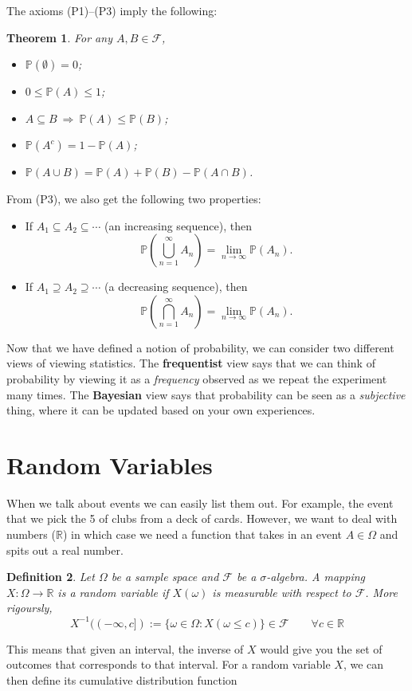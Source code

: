 \documentclass[twoside]{article}
\newcounter{lecnum}
\newenvironment{motivation}
  {\begin{tcolorbox}[motivationstyle]}
  {\end{tcolorbox}}
\newtheorem{theorem}{Theorem}[lecnum]
\newtheorem{definition}[theorem]{Definition}
\newcommand\F{\mathcal{F}}
\begin{document}
The axioms (P1)–(P3) imply the following:

\begin{theorem}
For any $A,B\in\mathcal{F}$,
\begin{itemize}
  \item $\mathbb{P}(\emptyset)=0$;
  \item $0\le \mathbb{P}(A)\le 1$;
  \item $A\subseteq B \ \Rightarrow\ \mathbb{P}(A)\le \mathbb{P}(B)$;
  \item $\mathbb{P}(A^{c}) = 1-\mathbb{P}(A)$;
  \item $\mathbb{P}(A\cup B)=\mathbb{P}(A)+\mathbb{P}(B)-\mathbb{P}(A\cap B)$.
\end{itemize}
\end{theorem}

From (P3), we also get the following two properties:

\begin{itemize}
    \item If $A_1\subseteq A_2\subseteq\cdots$ (an increasing sequence), then
\[
  \mathbb{P}\!\left(\bigcup_{n=1}^{\infty} A_n\right)
  = \lim_{n\to\infty}\mathbb{P}(A_n).
\]
\item If $A_1\supseteq A_2\supseteq\cdots$ (a decreasing sequence), then
\[
  \mathbb{P}\!\left(\bigcap_{n=1}^{\infty} A_n\right)
  = \lim_{n\to\infty}\mathbb{P}(A_n).
\]

\end{itemize}

Now that we have defined a notion of probability, we can consider two different views of viewing statistics. The \textbf{frequentist} view says that we can think of probability by viewing it as a \emph{frequency} observed as we repeat the experiment many times. The \textbf{Bayesian} view says that probability can be seen as a \textit{subjective} thing, where it can be updated based on your own experiences. 

\section{Random Variables}
\begin{motivation}
    When we talk about events we can easily list them out. For example, the event that we pick the 5 of clubs from a deck of cards. However, we want to deal with numbers ($\mathbb{R}$) in which case we need a function that takes in an event $A\in \Omega$ and spits out a real number.
\end{motivation}
\begin{definition}
    Let $\Omega$ be a sample space and $\F$ be a $\sigma$-algebra. A mapping $X:\Omega\rightarrow\mathbb{R}$ is a \emph{random variable} if $X(\omega)$ is measurable with respect to $\F$. More rigoursly,
    $$X^{-1}((-\infty,c]):=\{\omega\in\Omega:X(\omega\leq c)\}\in \F\qquad \forall c\in\mathbb{R}$$
\end{definition}
This means that given an interval, the inverse of $X$ would give you the set of outcomes that corresponds to that interval. For a random variable $X$, we can then define its cumulative distribution function
\end{document}
